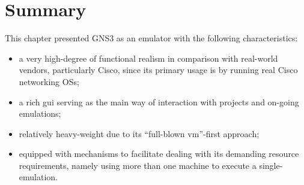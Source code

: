 \section{Summary}
\label{sec:gns3summary}

This chapter presented GNS3 as an emulator with the following characteristics:
\begin{itemize}
  \item a very high-degree of functional realism in comparison with real-world vendors, particularly Cisco, since its primary usage is by running real Cisco networking OSs;
  \item a rich \gls{gui} serving as the main way of interaction with projects and on-going emulations;
  \item relatively heavy-weight due to its ``full-blown \gls{vm}''-first approach;
  \item equipped with mechanisms to facilitate dealing with its demanding resource requirements, namely using more than one machine to execute a single-emulation.
\end{itemize}

